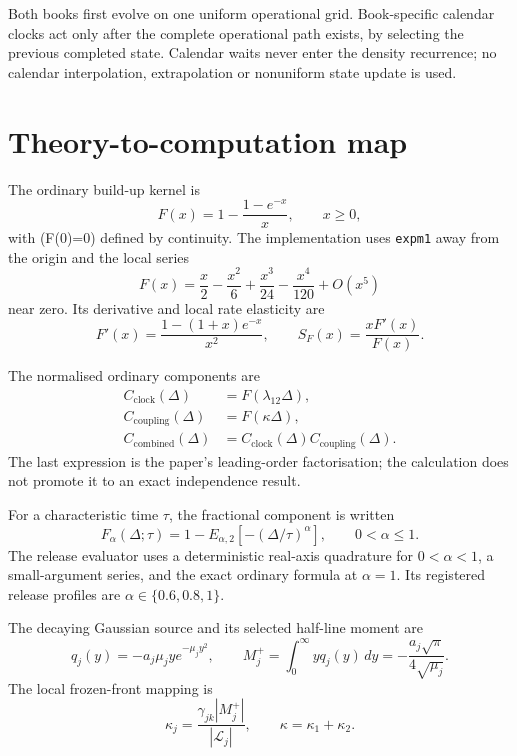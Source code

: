 \documentclass[11pt]{article}
\begin{document}
Both books first evolve on one uniform operational grid. Book-specific calendar clocks act only after the complete operational path exists, by selecting the previous completed state. Calendar waits never enter the density recurrence; no calendar interpolation, extrapolation or nonuniform state update is used.

\section{Theory-to-computation map}

The ordinary build-up kernel is
\begin{equation}
F(x)=1-\frac{1-e^{-x}}{x},\qquad x\geq0,
\label{eq:ordinary}
\end{equation}
with (F(0)=0) defined by continuity. The implementation uses \texttt{expm1} away from the origin and the local series
\begin{equation}
F(x)=\frac{x}{2}-\frac{x^2}{6}+\frac{x^3}{24}-\frac{x^4}{120}+O(x^5)
\end{equation}
near zero. Its derivative and local rate elasticity are
\begin{equation}
F'(x)=\frac{1-(1+x)e^{-x}}{x^2},
\qquad
S_F(x)=\frac{xF'(x)}{F(x)}.
\label{eq:elasticity}
\end{equation}

The normalised ordinary components are
\begin{align}
C_{\mathrm{clock}}(\Delta)&=F(\lambda_{12}\Delta),\\
C_{\mathrm{coupling}}(\Delta)&=F(\kappa\Delta),\\
C_{\mathrm{combined}}(\Delta)&=C_{\mathrm{clock}}(\Delta)C_{\mathrm{coupling}}(\Delta).
\end{align}
The last expression is the paper's leading-order factorisation; the calculation does not promote it to an exact independence result.

For a characteristic time \(\tau\), the fractional component is written
\begin{equation}
F_\alpha(\Delta;\tau)
=1-E_{\alpha,2}\!\left[-(\Delta/\tau)^\alpha\right],
\qquad 0<\alpha\leq1.
\label{eq:fractional}
\end{equation}
The release evaluator uses a deterministic real-axis quadrature for \(0<\alpha<1\), a small-argument series, and the exact ordinary formula at \(\alpha=1\). Its registered release profiles are \(\alpha\in\{0.6,0.8,1\}\).

The decaying Gaussian source and its selected half-line moment are
\begin{equation}
q_j(y)=-a_j\mu_j y e^{-\mu_jy^2},
\qquad
M_j^+=\int_0^\infty yq_j(y)\,dy
=-\frac{a_j\sqrt\pi}{4\sqrt{\mu_j}}.
\label{eq:moment}
\end{equation}
The local frozen-front mapping is
\begin{equation}
\kappa_j=\frac{\gamma_{jk}|M_j^+|}{|\mathcal L_j|},
\qquad
\kappa=\kappa_1+\kappa_2.
\label{eq:response}
\end{equation}
\end{document}

